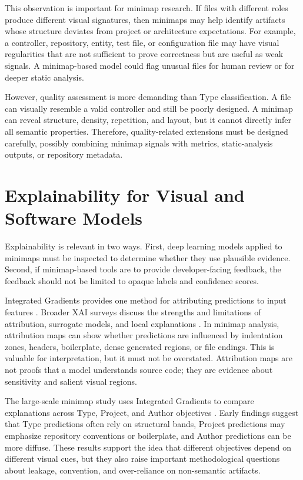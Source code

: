 This observation is important for minimap research. If files with different
roles produce different visual signatures, then minimaps may help identify
artifacts whose structure deviates from project or architecture expectations.
For example, a controller, repository, entity, test file, or configuration file
may have visual regularities that are not sufficient to prove correctness but
are useful as weak signals. A minimap-based model could flag unusual files for
human review or for deeper static analysis.

However, quality assessment is more demanding than Type classification. A file
can visually resemble a valid controller and still be poorly designed. A
minimap can reveal structure, density, repetition, and layout, but it cannot
directly infer all semantic properties. Therefore, quality-related extensions
must be designed carefully, possibly combining minimap signals with metrics,
static-analysis outputs, or repository metadata.

\section{Explainability for Visual and Software Models}

Explainability is relevant in two ways. First, deep learning models applied to
minimaps must be inspected to determine whether they use plausible evidence.
Second, if minimap-based tools are to provide developer-facing feedback, the
feedback should not be limited to opaque labels and confidence scores.

Integrated Gradients provides one method for attributing predictions to input
features \cite{integratedgradients2017}. Broader XAI surveys discuss the
strengths and limitations of attribution, surrogate models, and local
explanations \cite{adadi2018xai}. In minimap analysis, attribution maps can
show whether predictions are influenced by indentation zones, headers,
boilerplate, dense generated regions, or file endings. This is valuable for
interpretation, but it must not be overstated. Attribution maps are not proofs
that a model understands source code; they are evidence about sensitivity and
salient visual regions.

The large-scale minimap study uses Integrated Gradients to compare explanations
across Type, Project, and Author objectives \cite{gebara2025ciarp}. Early
findings suggest that Type predictions often rely on structural bands,
Project predictions may emphasize repository conventions or boilerplate, and
Author predictions can be more diffuse. These results support the idea that
different objectives depend on different visual cues, but they also raise
important methodological questions about leakage, convention, and over-reliance
on non-semantic artifacts.

